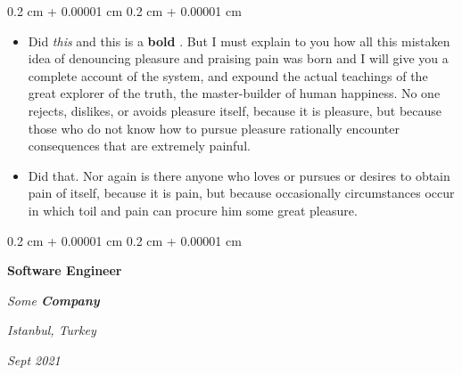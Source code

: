 \documentclass[10pt, letterpaper]{article}
\newenvironment{highlights}{
    \begin{itemize}[
        topsep=0.10 cm,
        parsep=0.10 cm,
        partopsep=0pt,
        itemsep=0pt,
        leftmargin=0.4 cm + 10pt
    ]
}{
    \end{itemize}
} %
\newenvironment{onecolentry}{
    \begin{adjustwidth}{
        0.2 cm + 0.00001 cm
    }{
        0.2 cm + 0.00001 cm
    }
}{
    \end{adjustwidth}
} %
\newenvironment{twocolentry}[2][]{
    \onecolentry
    \def\secondColumn{#2}
    \setcolumnwidth{\fill, 4.5 cm}
    \begin{paracol}{2}
}{
    \switchcolumn \raggedleft \secondColumn
    \end{paracol}
    \endonecolentry
} %
\let\hrefWithoutArrow\href
\renewcommand{\href}[2]{\hrefWithoutArrow{#1}{\ifthenelse{\equal{#2}{}}{ }{#2 }\raisebox{.15ex}{\footnotesize \faExternalLink*}}}
\begin{document}
        \vspace{0.10 cm}
        \begin{onecolentry}
            \begin{highlights}
                \item Did \textit{this} and this is a \textbf{bold} \href{https://example.com}{link}. But I must explain to you how all this mistaken idea of denouncing pleasure and praising pain was born and I will give you a complete account of the system, and expound the actual teachings of the great explorer of the truth, the master-builder of human happiness. No one rejects, dislikes, or avoids pleasure itself, because it is pleasure, but because those who do not know how to pursue pleasure rationally encounter consequences that are extremely painful.
                \item Did that. Nor again is there anyone who loves or pursues or desires to obtain pain of itself, because it is pain, but because occasionally circumstances occur in which toil and pain can procure him some great pleasure.
            \end{highlights}
        \end{onecolentry}


        \vspace{0.2 cm}

            \begin{twocolentry}{
        \textit{Istanbul, Turkey}

        \textit{Sept 2021}    }
                \textbf{Software Engineer}

                \textit{Some \textbf{Company}}
            \end{twocolentry}
\end{document}
